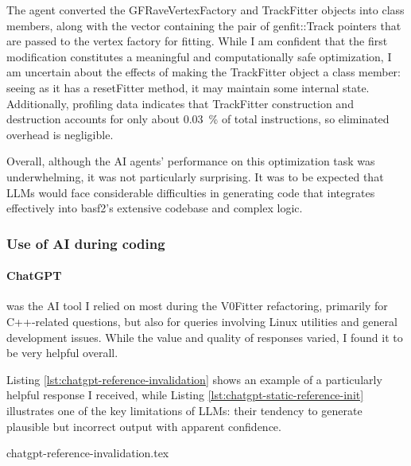 The agent converted the GFRaveVertexFactory and TrackFitter objects into class members, along with the vector containing the pair of genfit::Track pointers that are passed to the vertex factory for fitting.
While I am confident that the first modification constitutes a meaningful and computationally safe optimization, I am uncertain about the effects of making the TrackFitter object a class member: seeing as it has a resetFitter method, it may maintain some internal state.
Additionally, profiling data indicates that TrackFitter construction and destruction accounts for only about \qty{0.03}{\percent} of total instructions, so eliminated overhead is negligible.

\vspace{\baselineskip}
Overall, although the AI agents' performance on this optimization task was underwhelming, it was not particularly surprising. 
It was to be expected that LLMs would face considerable difficulties in generating code that integrates effectively into basf2's extensive codebase and complex logic.

\subsubsection{Use of AI during coding}
\paragraph{ChatGPT} was the AI tool I relied on most during the V0Fitter refactoring, primarily for C++-related questions, but also for queries involving Linux utilities and general development issues.
While the value and quality of responses varied, I found it to be very helpful overall.

Listing \ref{lst:chatgpt-reference-invalidation} shows an example of a particularly helpful response I received, while Listing \ref{lst:chatgpt-static-reference-init} illustrates one of the key limitations of LLMs: their tendency to generate plausible but incorrect output with apparent confidence.

\begin{lstbox}{%
    \label{lst:chatgpt-reference-invalidation}
  }
  {chatgpt-reference-invalidation.tex}
\end{lstbox}%

